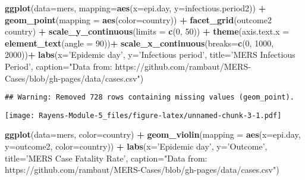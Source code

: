 \documentclass[]{article}
\newenvironment{Shaded}{\begin{snugshade}}{\end{snugshade}}
\newcommand{\DataTypeTok}[1]{\textcolor[rgb]{0.13,0.29,0.53}{#1}}
\newcommand{\DecValTok}[1]{\textcolor[rgb]{0.00,0.00,0.81}{#1}}
\newcommand{\KeywordTok}[1]{\textcolor[rgb]{0.13,0.29,0.53}{\textbf{#1}}}
\newcommand{\NormalTok}[1]{#1}
\newcommand{\OperatorTok}[1]{\textcolor[rgb]{0.81,0.36,0.00}{\textbf{#1}}}
\newcommand{\StringTok}[1]{\textcolor[rgb]{0.31,0.60,0.02}{#1}}
\begin{document}
\begin{Shaded}
\begin{Highlighting}[]
\KeywordTok{ggplot}\NormalTok{(}\DataTypeTok{data=}\NormalTok{mers, }\DataTypeTok{mapping=}\KeywordTok{aes}\NormalTok{(}\DataTypeTok{x=}\NormalTok{epi.day, }\DataTypeTok{y=}\NormalTok{infectious.period2)) }\OperatorTok{+}\StringTok{ }
\StringTok{  }\KeywordTok{geom_point}\NormalTok{(}\DataTypeTok{mapping =} \KeywordTok{aes}\NormalTok{(}\DataTypeTok{color=}\NormalTok{country)) }\OperatorTok{+}
\StringTok{  }\KeywordTok{facet_grid}\NormalTok{(outcome2 }\OperatorTok{~}\StringTok{ }\NormalTok{country) }\OperatorTok{+}\StringTok{ }
\StringTok{  }\KeywordTok{scale_y_continuous}\NormalTok{(}\DataTypeTok{limits =} \KeywordTok{c}\NormalTok{(}\DecValTok{0}\NormalTok{, }\DecValTok{50}\NormalTok{)) }\OperatorTok{+}
\StringTok{   }\KeywordTok{theme}\NormalTok{(}\DataTypeTok{axis.text.x =} \KeywordTok{element_text}\NormalTok{(}\DataTypeTok{angle =} \DecValTok{90}\NormalTok{))}\OperatorTok{+}
\StringTok{  }\KeywordTok{scale_x_continuous}\NormalTok{(}\DataTypeTok{breaks=}\KeywordTok{c}\NormalTok{(}\DecValTok{0}\NormalTok{, }\DecValTok{1000}\NormalTok{, }\DecValTok{2000}\NormalTok{))}\OperatorTok{+}
\StringTok{   }\KeywordTok{labs}\NormalTok{(}\DataTypeTok{x=}\StringTok{'Epidemic day'}\NormalTok{, }\DataTypeTok{y=}\StringTok{'Infectious period'}\NormalTok{,}
       \DataTypeTok{title=}\StringTok{'MERS Infectious Period'}\NormalTok{, }\DataTypeTok{caption=}\StringTok{"Data from: https://github.com/rambaut/MERS-Cases/blob/gh-pages/data/cases.csv"}\NormalTok{)}
\end{Highlighting}
\end{Shaded}

\begin{verbatim}
## Warning: Removed 728 rows containing missing values (geom_point).
\end{verbatim}

\texttt{[image: Rayens-Module-5\_files/figure-latex/unnamed-chunk-3-1.pdf]}

\begin{Shaded}
\begin{Highlighting}[]
\KeywordTok{ggplot}\NormalTok{(}\DataTypeTok{data=}\NormalTok{mers, }\DataTypeTok{color=}\NormalTok{country) }\OperatorTok{+}\StringTok{ }
\StringTok{  }\KeywordTok{geom_violin}\NormalTok{(}\DataTypeTok{mapping =} \KeywordTok{aes}\NormalTok{(}\DataTypeTok{x=}\NormalTok{epi.day, }\DataTypeTok{y=}\NormalTok{outcome2, }\DataTypeTok{color=}\NormalTok{country)) }\OperatorTok{+}
\StringTok{   }\KeywordTok{labs}\NormalTok{(}\DataTypeTok{x=}\StringTok{'Epidemic day'}\NormalTok{, }\DataTypeTok{y=}\StringTok{'Outcome'}\NormalTok{,}
       \DataTypeTok{title=}\StringTok{'MERS Case Fatality Rate'}\NormalTok{, }\DataTypeTok{caption=}\StringTok{"Data from: https://github.com/rambaut/MERS-Cases/blob/gh-pages/data/cases.csv"}\NormalTok{)}
\end{Highlighting}
\end{Shaded}
\end{document}
